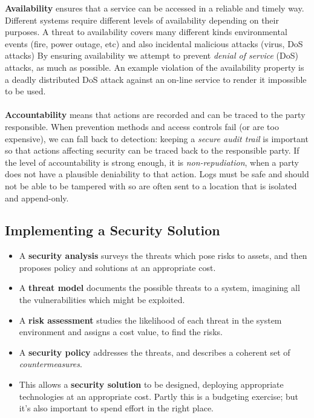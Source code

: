 \documentclass[11pt]{article}
\begin{document}
\textbf{Availability} ensures that a service can be accessed in a reliable and timely way.
Different systems require different levels of availability depending on their purposes.
A threat to availability covers many different kinds environmental events (fire, power outage, etc) and also incidental malicious attacks (virus, DoS attacks)
By ensuring availability we attempt to prevent \textit{denial of service} (DoS) attacks, as much as possible.
An example violation of the availability property is a deadly distributed DoS attack against an on-line service to render it impossible to be used.
\\ \\
\textbf{Accountability} means that actions are recorded and can be traced to the party responsible.
When prevention methods and access controls fail (or are too expensive), we can fall back to detection: keeping a \textit{secure audit trail} is important so that actions affecting security can be traced back to the responsible party.
If the level of accountability is strong enough, it is \textit{non-repudiation}, when a party does not have a plausible deniability to that action.
Logs must be safe and should not be able to be tampered with so are often sent to a location that is isolated and append-only.

\subsection{Implementing a Security Solution}
\begin{itemize}
    \item A \textbf{security analysis} surveys the threats which pose risks to assets, and then proposes policy and solutions at an appropriate cost.
    \item A \textbf{threat model} documents the possible threats to a system, imagining all the vulnerabilities which might be exploited.
    \item A \textbf{risk assessment} studies the likelihood of each threat in the system environment and assigns a cost value, to find the risks.
    \item A \textbf{security policy} addresses the threats, and describes a coherent set of \textit{countermeasures}.
    \item This allows a \textbf{security solution} to be designed, deploying appropriate technologies at an appropriate cost.
          Partly this is a budgeting exercise; but it's also important to spend effort in the right place.
\end{itemize}
\end{document}
